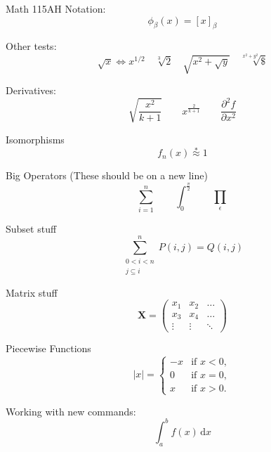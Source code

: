 \documentclass[a4paper,11pt,autostyle=true]{article}
\begin{document}
 Math 115AH Notation:
 \begin{equation}
     \phi_\beta(x) = [x]_\beta
 \end{equation}
 
 Other tests:
 \begin{equation}
 \sqrt{x} \Leftrightarrow x^{1/2}
 \quad \sqrt[3]{2}
 \quad \sqrt{x^{2} + \sqrt{y}}
 \quad \surd[x^2 + y^2]$
 \end{equation}
 
Derivatives:
\begin{equation*}
  \sqrt{\frac{x^2}{k+1}}\qquad
  x^\frac{2}{k+1}\qquad
  \frac{\partial^2f}
  {\partial x^2}
\end{equation*}

Isomorphisms
\begin{equation*}
 f_n(x) \stackrel{*}{\approx} 1
\end{equation*}

Big Operators
(These should be on a new line)
\begin{equation}
\sum_{i=1}^n \qquad
\int_0^{\frac{\pi}{2}} \qquad
\prod_\epsilon
\end{equation}

Subset stuff
\begin{equation}
\sum^n_{\substack{0<i<n \\
        j\subseteq i}}
   P(i,j) = Q(i,j)
\end{equation}

Matrix stuff 
\begin{equation*}
    \mathbf{X} = \left(
      \begin{array}{ccc}
        x_1 & x_2 & \ldots \\
        x_3 & x_4 & \ldots \\
        \vdots & \vdots & \ddots
      \end{array} \right)
  \end{equation*}

Piecewise Functions
\begin{equation}
  |x| = \left\{
    \begin{array}{rl}
      -x & \text{if } x < 0,\\
      0 & \text{if } x = 0,\\
      x & \text{if } x > 0.
    \end{array} \right.
\end{equation}

Working with new commands:
\newcommand{\ud}{\,\mathrm{d}}
\begin{equation}
 \int_a^b f(x)\ud x
\end{equation}
\end{document}
